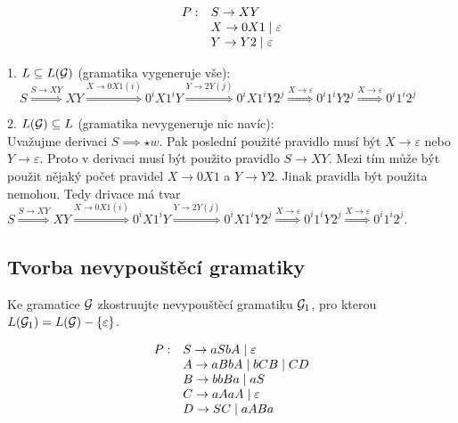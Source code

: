 \[
    \begin{array}{l l}
        P: & S \rightarrow XY  \\
        & X \rightarrow 0X1 \mid \varepsilon  \\ 
        & Y \rightarrow Y2 \mid \varepsilon \\
    \end{array}
\]
\vspace*{3mm}

1. $L \subseteq L(\mathcal{G})$ (gramatika vygeneruje vše): \\

$\quad S \stackrel{S \rightarrow XY}{\Longrightarrow} XY \stackrel{X \rightarrow 0X1 (i)}{\Longrightarrow} 0^iX1^iY 
\stackrel{Y \rightarrow 2Y(j)}{\Longrightarrow} 0^iX1^iY2^j \stackrel{X \rightarrow \varepsilon}{\Longrightarrow} 
0^i1^iY2^j\stackrel{X \rightarrow \varepsilon}{\Longrightarrow} 0^i1^i2^j $

\vspace*{3mm}
2. $L(\mathcal{G}) \subseteq L$ (gramatika nevygeneruje nic navíc): \\

\noindent
Uvažujme derivaci $S \implies \star w$. Pak poslední použité pravidlo musí být $X \rightarrow \varepsilon$ nebo 
$Y \rightarrow \varepsilon$. Proto v derivaci musí být použito pravidlo $S \rightarrow XY$. Mezi tím může být použit 
nějaký počet pravidel $X \rightarrow 0X1$ a $Y \rightarrow Y2$. Jinak pravidla být použita nemohou. Tedy drivace má tvar 
$ S \stackrel{S \rightarrow XY}{\Longrightarrow} XY \stackrel{X \rightarrow 0X1 (i)}{\Longrightarrow} 0^iX1^iY 
\stackrel{Y \rightarrow 2Y(j)}{\Longrightarrow} 0^iX1^iY2^j \stackrel{X \rightarrow \varepsilon}{\Longrightarrow} 
0^i1^iY2^j\stackrel{X \rightarrow \varepsilon}{\Longrightarrow} 0^i1^i2^j $.

\subsection{Tvorba nevypouštěcí gramatiky}
\noindent
Ke gramatice $\mathcal{G}$ zkostruujte nevypouštěcí gramatiku $\mathcal{G}_1$, pro kterou $L(\mathcal{G}_1) = L(\mathcal{G}) - \{\varepsilon\}$.

\[
    \begin{array}{l l}
        P: & S \rightarrow aSbA \mid \varepsilon \\
           & A \rightarrow aBbA \mid bCB \mid CD \\
           & B \rightarrow bbBa \mid aS \\
           & C \rightarrow aAaA \mid \varepsilon \\
           & D \rightarrow SC \mid aABa \\
    \end{array}
\]



